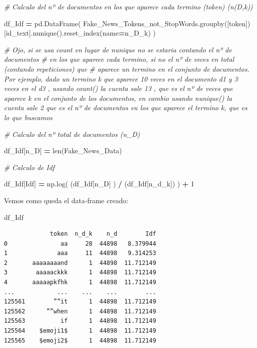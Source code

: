 \documentclass[
  11pt,
  a4paper,
]{article}
\newenvironment{Shaded}{\begin{snugshade}}{\end{snugshade}}
\newcommand{\BuiltInTok}[1]{#1}
\newcommand{\CommentTok}[1]{\textcolor[rgb]{0.56,0.35,0.01}{\textit{#1}}}
\newcommand{\DecValTok}[1]{\textcolor[rgb]{0.00,0.00,0.81}{#1}}
\newcommand{\NormalTok}[1]{#1}
\newcommand{\OperatorTok}[1]{\textcolor[rgb]{0.81,0.36,0.00}{\textbf{#1}}}
\newcommand{\StringTok}[1]{\textcolor[rgb]{0.31,0.60,0.02}{#1}}
\begin{document}
\begin{Shaded}
\begin{Highlighting}[]
\CommentTok{\# Calculo del nº de documentos en los que aparece cada termino (token) (n(D,k))}

\NormalTok{df\_Idf }\OperatorTok{=}\NormalTok{ pd.DataFrame( Fake\_News\_Tokens\_not\_StopWords.groupby([}\StringTok{\textquotesingle{}token\textquotesingle{}}\NormalTok{])[}\StringTok{\textquotesingle{}id\_text\textquotesingle{}}\NormalTok{].nunique().reset\_index(name}\OperatorTok{=}\StringTok{\textquotesingle{}n\_D\_k\textquotesingle{}}\NormalTok{) )}

\CommentTok{\# Ojo, si se usa count en lugar de nunique no se estaria contando el nº de documentos}
\CommentTok{\# en los que aparece cada termino, si no el nº de veces en total (contando repeticiones) que}
\CommentTok{\# aparece un termino en el conjunto de documentos. Por ejemplo, dado un termino k que aparece 10 veces en el documento d1 y 3 veces en el d3 , usando count() la cuenta sale 13 , que es el  nº de veces que aparece k en el conjunto de los documentos, en cambio usando nunique()  la cuenta sale 2 que es el nº de documentos en los que aparece el termino k, que es lo que buscamos}

\CommentTok{\# Calculo del nº total de documentos (n\_D)}

\NormalTok{df\_Idf[}\StringTok{\textquotesingle{}n\_D\textquotesingle{}}\NormalTok{] }\OperatorTok{=} \BuiltInTok{len}\NormalTok{(Fake\_News\_Data)}

\CommentTok{\# Calculo de Idf}

\NormalTok{df\_Idf[}\StringTok{\textquotesingle{}Idf\textquotesingle{}}\NormalTok{] }\OperatorTok{=}\NormalTok{ np.log( (df\_Idf[}\StringTok{\textquotesingle{}n\_D\textquotesingle{}}\NormalTok{] ) }\OperatorTok{/}\NormalTok{ (df\_Idf[}\StringTok{\textquotesingle{}n\_d\_k\textquotesingle{}}\NormalTok{]) ) }\OperatorTok{+} \DecValTok{1} 
\end{Highlighting}
\end{Shaded}

Vemos como queda el data-frame creado:

\begin{Shaded}
\begin{Highlighting}[]
\NormalTok{df\_Idf}
\end{Highlighting}
\end{Shaded}

\begin{verbatim}
             token  n_d_k    n_d        Idf
0               aa     28  44898   8.379944
1              aaa     11  44898   9.314253
2       aaaaaaaand      1  44898  11.712149
3        aaaaackkk      1  44898  11.712149
4       aaaaapkfhk      1  44898  11.712149
...            ...    ...    ...        ...
125561        ””it      1  44898  11.712149
125562      ””when      1  44898  11.712149
125563          if      1  44898  11.712149
125564    $emoji1$      1  44898  11.712149
125565    $emoji2$      1  44898  11.712149
\end{verbatim}
\end{document}
